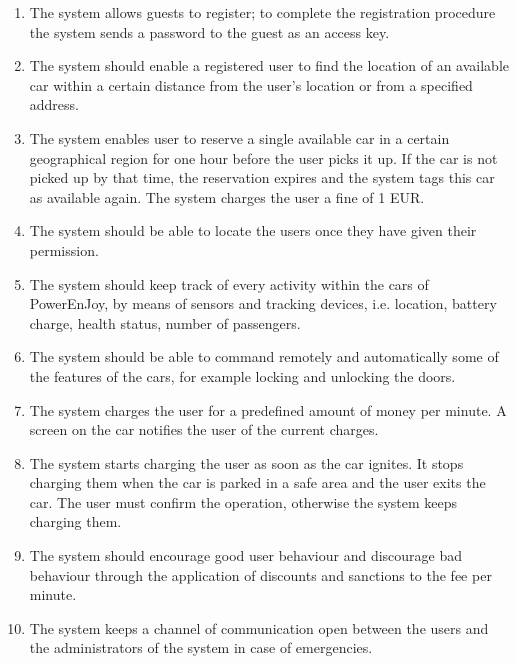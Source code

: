 			
			
			
			\begin{enumerate}
				\item The system allows guests to register; to complete the registration procedure the system sends a password to the guest as an access key.
				\item The system should enable a registered user to find the location of an available car within a certain distance from the user's location or from a specified address.
				\item The system enables user to reserve a single available car in a certain geographical region for one hour before the user picks it up. If the car is not picked up by that time, the reservation expires and the system tags this car as available again. The system charges the user a fine of 1 EUR.
				\item The system should be able to locate the users once they have given their permission.
				\item The system should keep track of every activity within the cars of PowerEnJoy, by means of sensors and tracking devices, i.e. location, battery charge, health status, number of passengers. 
				\item The system should be able to command remotely and automatically some of the features of the cars, for example locking and unlocking the doors. 
				\item The system charges the user for a predefined amount of money per minute. A screen on the car notifies the user of the current charges.
				\item The system starts charging the user as soon as the car ignites. It stops charging them when the car is parked in a safe area and the user exits the car. The user must confirm the operation, otherwise the system keeps charging them. 
				\item The system should encourage good user behaviour and discourage bad behaviour through the application of discounts and sanctions to the fee per minute. 
				\item The system keeps a channel of communication open between the users and the administrators of the system in case of emergencies. 
			\end{enumerate}						
			
			
			
